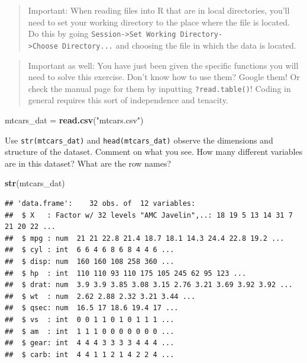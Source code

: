 \documentclass[
]{article}
\newenvironment{Shaded}{\begin{snugshade}}{\end{snugshade}}
\newcommand{\KeywordTok}[1]{\textcolor[rgb]{0.13,0.29,0.53}{\textbf{#1}}}
\newcommand{\NormalTok}[1]{#1}
\newcommand{\StringTok}[1]{\textcolor[rgb]{0.31,0.60,0.02}{#1}}
\begin{document}
\begin{quote}
Important: When reading files into R that are in local directories,
you'll need to set your working directory to the place where the file is
located. Do this by going
\texttt{Session-\textgreater{}Set\ Working\ Directory-\textgreater{}Choose\ Directory...}
and choosing the file in which the data is located.
\end{quote}

\begin{quote}
Important as well: You have just been given the specific functions you
will need to solve this exercise. Don't know how to use them? Google
them! Or check the manual page for them by inputting
\texttt{?read.table()}! Coding in general requires this sort of
independence and tenacity.
\end{quote}

\begin{Shaded}
\begin{Highlighting}[]
\NormalTok{mtcars_dat =}\StringTok{ }\KeywordTok{read.csv}\NormalTok{(}\StringTok{"mtcars.csv"}\NormalTok{)}
\end{Highlighting}
\end{Shaded}

Use \texttt{str(mtcars\_dat)} and \texttt{head(mtcars\_dat)} observe the
dimensions and structure of the dataset. Comment on what you see. How
many different variables are in this dataset? What are the row names?

\begin{Shaded}
\begin{Highlighting}[]
\KeywordTok{str}\NormalTok{(mtcars_dat)}
\end{Highlighting}
\end{Shaded}

\begin{verbatim}
## 'data.frame':    32 obs. of  12 variables:
##  $ X   : Factor w/ 32 levels "AMC Javelin",..: 18 19 5 13 14 31 7 21 20 22 ...
##  $ mpg : num  21 21 22.8 21.4 18.7 18.1 14.3 24.4 22.8 19.2 ...
##  $ cyl : int  6 6 4 6 8 6 8 4 4 6 ...
##  $ disp: num  160 160 108 258 360 ...
##  $ hp  : int  110 110 93 110 175 105 245 62 95 123 ...
##  $ drat: num  3.9 3.9 3.85 3.08 3.15 2.76 3.21 3.69 3.92 3.92 ...
##  $ wt  : num  2.62 2.88 2.32 3.21 3.44 ...
##  $ qsec: num  16.5 17 18.6 19.4 17 ...
##  $ vs  : int  0 0 1 1 0 1 0 1 1 1 ...
##  $ am  : int  1 1 1 0 0 0 0 0 0 0 ...
##  $ gear: int  4 4 4 3 3 3 3 4 4 4 ...
##  $ carb: int  4 4 1 1 2 1 4 2 2 4 ...
\end{verbatim}
\end{document}
